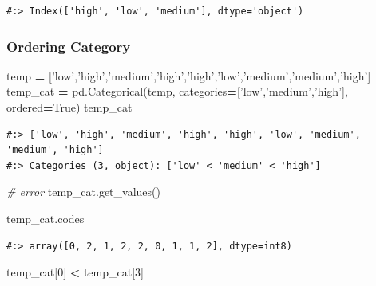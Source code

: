 \documentclass[
]{book}
\newenvironment{Shaded}{\begin{snugshade}}{\end{snugshade}}
\newcommand{\CommentTok}[1]{\textcolor[rgb]{0.37,0.37,0.37}{\textit{#1}}}
\newcommand{\DecValTok}[1]{\textcolor[rgb]{0.06,0.06,0.06}{#1}}
\newcommand{\NormalTok}[1]{#1}
\newcommand{\OperatorTok}[1]{\textcolor[rgb]{0.43,0.43,0.43}{\textbf{#1}}}
\newcommand{\StringTok}[1]{\textcolor[rgb]{0.5,0.5,0.5}{#1}}
\newcommand{\VariableTok}[1]{\textcolor[rgb]{0,0,0}{#1}}
\begin{document}
\begin{verbatim}
#:> Index(['high', 'low', 'medium'], dtype='object')
\end{verbatim}

\hypertarget{ordering-category}{%
\subsubsection{Ordering Category}\label{ordering-category}}

\begin{Shaded}
\begin{Highlighting}[]
\NormalTok{temp }\OperatorTok{=}\NormalTok{ [}\StringTok{'low'}\NormalTok{,}\StringTok{'high'}\NormalTok{,}\StringTok{'medium'}\NormalTok{,}\StringTok{'high'}\NormalTok{,}\StringTok{'high'}\NormalTok{,}\StringTok{'low'}\NormalTok{,}\StringTok{'medium'}\NormalTok{,}\StringTok{'medium'}\NormalTok{,}\StringTok{'high'}\NormalTok{]}
\NormalTok{temp_cat }\OperatorTok{=}\NormalTok{ pd.Categorical(temp, categories}\OperatorTok{=}\NormalTok{[}\StringTok{'low'}\NormalTok{,}\StringTok{'medium'}\NormalTok{,}\StringTok{'high'}\NormalTok{], ordered}\OperatorTok{=}\VariableTok{True}\NormalTok{)}
\NormalTok{temp_cat}
\end{Highlighting}
\end{Shaded}

\begin{verbatim}
#:> ['low', 'high', 'medium', 'high', 'high', 'low', 'medium', 'medium', 'high']
#:> Categories (3, object): ['low' < 'medium' < 'high']
\end{verbatim}

\begin{Shaded}
\begin{Highlighting}[]
\CommentTok{# error}
\NormalTok{temp_cat.get_values()}
\end{Highlighting}
\end{Shaded}

\begin{Shaded}
\begin{Highlighting}[]
\NormalTok{temp_cat.codes}
\end{Highlighting}
\end{Shaded}

\begin{verbatim}
#:> array([0, 2, 1, 2, 2, 0, 1, 1, 2], dtype=int8)
\end{verbatim}

\begin{Shaded}
\begin{Highlighting}[]
\NormalTok{temp_cat[}\DecValTok{0}\NormalTok{] }\OperatorTok{<}\NormalTok{ temp_cat[}\DecValTok{3}\NormalTok{]}
\end{Highlighting}
\end{Shaded}
\end{document}

